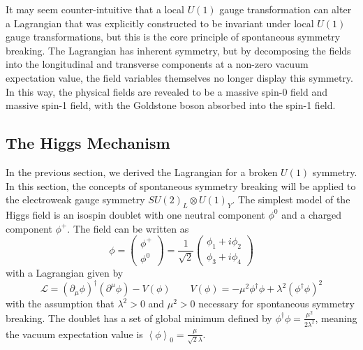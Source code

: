 It may seem counter-intuitive that a local $U(1)$ gauge transformation can alter a Lagrangian that was explicitly constructed to be invariant under local $U(1)$ gauge transformations, but this is the core principle of spontaneous symmetry breaking. The Lagrangian has inherent symmetry, but by decomposing the fields into the longitudinal and transverse components at a non-zero vacuum expectation value, the field variables themselves no longer display this symmetry. In this way, the physical fields are revealed to be a massive spin-0 field and massive spin-1 field, with the Goldstone boson absorbed into the spin-1 field.

\subsection{The Higgs Mechanism} \label{sec:sm_theory_beh}
In the previous section, we derived the Lagrangian for a broken $U(1)$ symmetry. In this section, the concepts of spontaneous symmetry breaking will be applied to the electroweak gauge symmetry $SU(2)_L\otimes U(1)_Y$. The simplest model of the Higgs field is an isospin doublet with one neutral component $\phi^0$ and a charged component $\phi^+$. The field can be written as
\begin{equation}
	\phi=\begin{pmatrix}\phi^+\\\phi^0\end{pmatrix}=\frac{1}{\sqrt{2}}\begin{pmatrix}\phi_1+i\phi_2\\\phi_3+i\phi_4\end{pmatrix}
\end{equation}
with a Lagrangian given by
\begin{equation}
	\mathcal{L}=(\partial_\mu\phi)^\dagger(\partial^\mu\phi)-V(\phi) \qquad V(\phi)=-\mu^2\phi^\dagger\phi+\lambda^2(\phi^\dagger\phi)^2
\end{equation}
with the assumption that $\lambda^2>0$ and $\mu^2>0$ necessary for spontaneous symmetry breaking.  The doublet has a set of global minimum defined by $\phi^\dagger\phi=\frac{\mu^2}{2\lambda^2}$, meaning the vacuum expectation value is $\left<\phi\right>_0=\frac{\mu}{\sqrt{2}\lambda}$.

